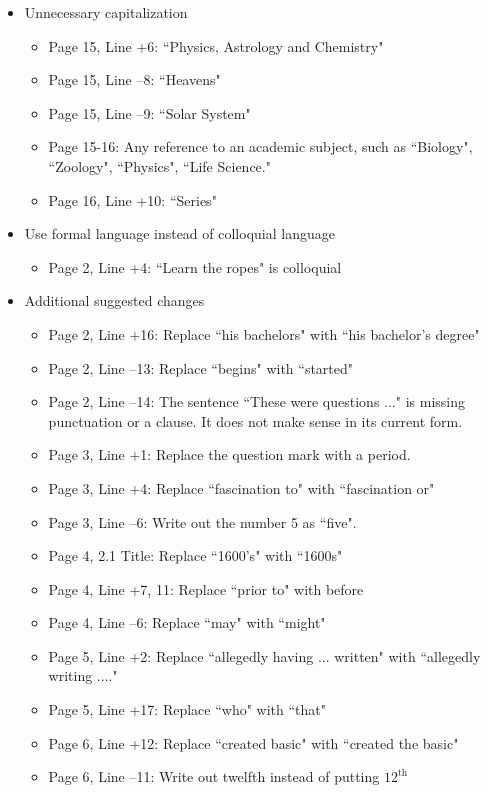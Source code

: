 \documentclass[11pt]{article}
\begin{document}
\begin{itemize}
	\item Unnecessary capitalization
	\begin{itemize}
		\item Page 15, Line +6: ``Physics, Astrology and Chemistry"
		\item Page 15, Line --8: ``Heavens"
		\item Page 15, Line --9: ``Solar System"
		\item Page 15-16: Any reference to an academic subject, such as ``Biology", ``Zoology", ``Physics", ``Life Science."
		\item Page 16, Line +10: ``Series"
	\end{itemize}
	\item Use formal language instead of colloquial language
	\begin{itemize}
		\item Page 2, Line +4: ``Learn the ropes" is colloquial
	\end{itemize}
	\item Additional suggested changes
	\begin{itemize}
		\item Page 2, Line +16: Replace ``his bachelors" with ``his bachelor’s degree"
		\item Page 2, Line --13: Replace ``begins" with  ``started" 
		\item Page 2, Line --14: The sentence ``These were questions ..." is missing punctuation or a clause. It does not make sense in its current form.
		\item Page 3, Line +1: Replace the question mark with a period.
		\item Page 3, Line +4: Replace ``fascination to" with ``fascination or"
		\item Page 3, Line --6: Write out the number 5 as ``five".
		\item Page 4, 2.1 Title: Replace ``1600's" with ``1600s"
		\item Page 4, Line +7, 11: Replace ``prior to" with before
		\item Page 4, Line --6: Replace ``may" with ``might"
		\item Page 5, Line +2: Replace ``allegedly having ... written" with ``allegedly writing ...."
		\item Page 5, Line +17: Replace ``who" with ``that"
		\item Page 6, Line +12: Replace ``created basic" with ``created the basic"
		\item Page 6, Line --11: Write out twelfth instead of putting $12^{\text{th}}$

\end{itemize}
\end{itemize}
\end{document}
